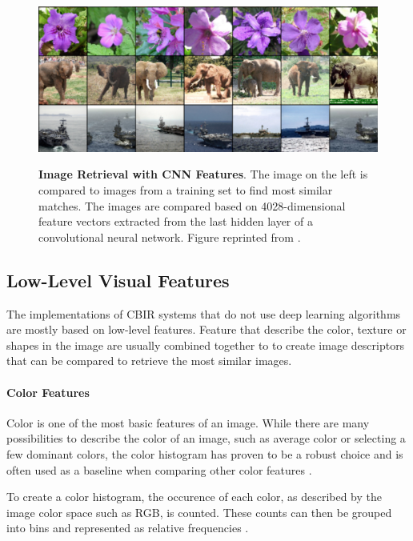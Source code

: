 \documentclass[12pt]{report}
\begin{document}
\begin{figure}[h]
\centering
{\includegraphics[width=\linewidth]{02_background/CBIR/cnn_cbir}}
\caption{\label{fig:conv_cbir} \textbf{Image Retrieval with CNN Features}. The image on the left is compared to images from a training set to find most similar matches. The images are compared based on 4028-dimensional feature vectors extracted from the last hidden layer of a convolutional neural network. Figure reprinted from \cite{NIPS2012_4824}.}
\end{figure}


\pagebreak
\subsection{Low-Level Visual Features}
The implementations of CBIR systems that do not use deep learning algorithms are mostly based on low-level features. Feature that describe the color, texture or shapes in the image are usually combined together to to create image descriptors that can be compared to retrieve the most similar images.

\paragraph{Color Features}
Color is one of the most basic features of an image. While there are many possibilities to describe the color of an image, such as average color or selecting a few dominant colors, the color histogram has proven to be a robust choice and is often used as a baseline when comparing other color features \cite{Torres_content-basedimage}.

To create a color histogram, the occurence of each color, as described by the image color space such as RGB, is counted. These counts can then be grouped into bins and represented as relative frequencies \cite{Swain1991}.
\end{document}
